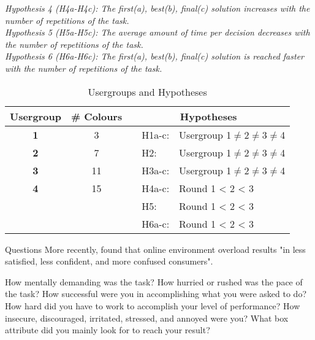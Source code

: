 \textit{Hypothesis 4 (H4a-H4c): The first(a), best(b), final(c) solution increases with the number of repetitions of the task. }\\
\textit{Hypothesis 5 (H5a-H5c): The average amount of time per decision decreases with the number of repetitions of the task. }\\
\textit{Hypothesis 6 (H6a-H6c): The first(a), best(b), final(c) solution is reached faster with the number of repetitions of the task. }

\begin{table}[htbp] %
  \centering
  \caption{Usergroups and Hypotheses}
  \label{tab:Hypotheses}
    \begin{tabular}{cc|rrr}
    \toprule
    \textbf{Usergroup} & \textbf{\# Colours} & \multicolumn{3}{c}{\textbf{Hypotheses}} \\
    \midrule
    \textbf{1} & 3     &  & \multicolumn{1}{l}{H1a-c: } & \multicolumn{1}{l}{Usergroup 1$\neq$2$\neq$3$\neq$4} \\
    \textbf{2} & 7     &       & \multicolumn{1}{l}{H2: } & \multicolumn{1}{l}{Usergroup 1$\neq$2$\neq$3$\neq$4} \\
    \textbf{3} & 11    &    &  \multicolumn{1}{l}{H3a-c: } & \multicolumn{1}{l}{Usergroup 1$\neq$2$\neq$3$\neq$4} \\
    \textbf{4} & 15    &    &  \multicolumn{1}{l}{H4a-c: } & \multicolumn{1}{l}{Round 1 < 2 < 3} \\
     &  	   &    &  \multicolumn{1}{l}{H5: } & \multicolumn{1}{l}{Round 1 < 2 < 3} \\
     & 		&    &  \multicolumn{1}{l}{H6a-c: } & \multicolumn{1}{l}{Round 1 < 2 < 3} \\
    \bottomrule
    \end{tabular}%
\end{table}%


Questions
More recently, \cite{Chen2009} found that online environment overload results "in less satisfied, less confident, and
more confused consumers".


How mentally demanding was the task?
How hurried or rushed was the pace of the task?
How successful were you in accomplishing what you were asked to do?
How hard did you have to work to accomplish your level of performance?
How insecure, discouraged, irritated, stressed, and annoyed were you?
What box attribute did you mainly look for to reach your result?
